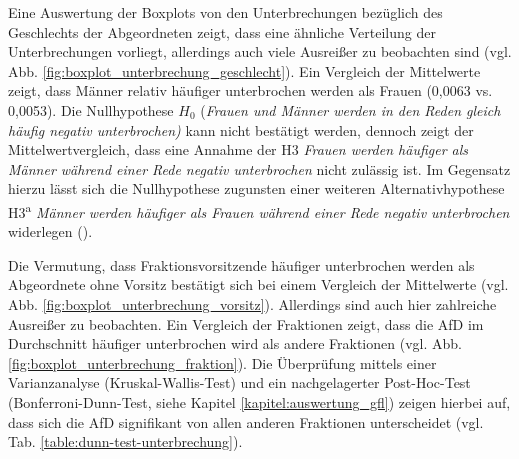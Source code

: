 \documentclass[12pt, 
    twoside=false, 
    bibliography=totoc, 
    numbers=endperiod, 
    headings=normal, 
    toc=chapterentrydotfill
    ]{scrbook}
\begin{document}
Eine Auswertung der Boxplots von den Unterbrechungen bezüglich des Geschlechts der Abgeordneten zeigt, dass eine ähnliche Verteilung der Unterbrechungen vorliegt, allerdings auch viele Ausreißer zu beobachten sind (vgl. Abb. \ref{fig:boxplot_unterbrechung_geschlecht}). Ein Vergleich der Mittelwerte zeigt, dass Männer relativ häufiger unterbrochen werden als Frauen (0,0063 vs. 0,0053). Die Nullhypothese $H_0$ (\emph{Frauen und Männer werden in den Reden gleich häufig negativ unterbrochen)} kann nicht bestätigt werden, dennoch zeigt der Mittelwertvergleich, dass eine Annahme der H3 \emph{Frauen werden häufiger als Männer während einer Rede negativ unterbrochen} nicht zulässig ist. Im Gegensatz hierzu lässt sich die Nullhypothese zugunsten einer weiteren Alternativhypothese H3\textsuperscript{a} \emph{Männer werden häufiger als Frauen während einer Rede negativ unterbrochen} widerlegen (). 


Die Vermutung, dass Fraktionsvorsitzende häufiger unterbrochen werden als Abgeordnete ohne Vorsitz bestätigt sich bei einem Vergleich der Mittelwerte (vgl. Abb. \ref{fig:boxplot_unterbrechung_vorsitz}). Allerdings sind auch hier zahlreiche Ausreißer zu beobachten. Ein Vergleich der Fraktionen zeigt, dass die AfD im Durchschnitt häufiger unterbrochen wird als andere Fraktionen (vgl. Abb. \ref{fig:boxplot_unterbrechung_fraktion}). Die Überprüfung mittels einer Varianzanalyse (Kruskal-Wallis-Test) und ein nachgelagerter Post-Hoc-Test (Bonferroni-Dunn-Test, siehe Kapitel \ref{kapitel:auswertung_gfl}) zeigen hierbei auf, dass sich die AfD signifikant von allen anderen Fraktionen unterscheidet (vgl. Tab. \ref{table:dunn-test-unterbrechung}).
\end{document}
